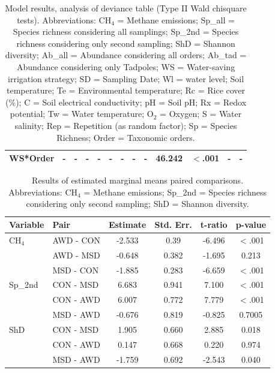 \begin{table}
\begin{tabular}{l cc cc cc cc cc cc}
    WS*Order & - & - & - & - & - & - & - & - & 46.242 & $<$.001 & - & - \\
    \bottomrule
\end{tabular}
    \caption{Model results, analysis of deviance table (Type II Wald chisquare tests). Abbreviations: CH$_{4}$ = Methane emissions; Sp\_all = Species richness considering all samplings; Sp\_2nd = Species richness considering only second sampling; ShD = Shannon diversity; Ab\_all = Abundance considering all orders; Ab\_tad = Abundance considering only Tadpoles; WS = Water-saving irrigation strategy; SD = Sampling Date; Wl = water level; Soil temperature; Te = Environmental temperature; Rc = Rice cover (\%); C = Soil electrical conductivity; pH = Soil pH; Rx = Redox potential; Tw = Water temperature; O$_{2}$ = Oxygen; S = Water salinity; Rep = Repetition (as random factor); Sp = Species Richness;  Order = Taxonomic orders.}
    \label{mod_res}
\end{table}


\begin{table}[htbp]
\scriptsize %
    \centering
    \begin{tabular}{llcccc}
        \toprule
        Variable & Pair & Estimate & Std. Err. & t-ratio & p-value \\
        \midrule
        CH$_{4}$ & AWD - CON  & -2.533  & 0.39  & -6.496  & $<$.001 \\
         & AWD - MSD  & -0.648  & 0.382 & -1.695  & 0.213 \\
         & MSD - CON  & -1.885  & 0.283 & -6.659  & $<$.001 \\
        \midrule
        Sp\_2nd & CON - MSD  & 6.683   & 0.941 & 7.100   & $<$.001 \\
         & CON - AWD  & 6.007   & 0.772 & 7.779   & $<$.001 \\
         & MSD - AWD  & -0.676  & 0.819 & -0.825  & 0.7005 \\
        \midrule
        ShD & CON - MSD  & 1.905   & 0.660 & 2.885   & 0.018 \\
         & CON - AWD  & 0.147   & 0.668 & 0.220   & 0.974 \\
         & MSD - AWD  & -1.759  & 0.692 & -2.543  & 0.040 \\
        \bottomrule
    \end{tabular}
        \caption{Results of estimated marginal means paired comparisons. Abbreviations: CH$_{4}$ = Methane emissions; Sp\_2nd = Species richness considering only second sampling; ShD = Shannon diversity.}
            \label{mod_pairs}
\end{table}

